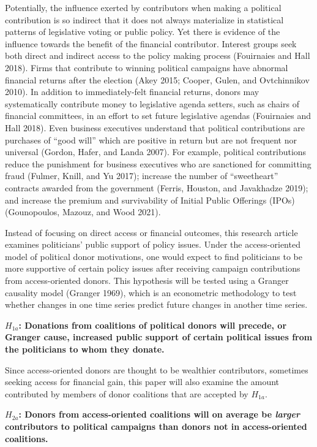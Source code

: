 \documentclass[12pt,]{article}
\begin{document}
Potentially, the influence exerted by contributors when making a
political contribution is so indirect that it does not always
materialize in statistical patterns of legislative voting or public
policy. Yet there is evidence of the influence towards the benefit of
the financial contributor. Interest groups seek both direct and indirect
access to the policy making process (Fouirnaies and Hall 2018). Firms
that contribute to winning political campaigns have abnormal financial
returns after the election (Akey 2015; Cooper, Gulen, and Ovtchinnikov
2010). In addition to immediately-felt financial returns, donors may
systematically contribute money to legislative agenda setters, such as
chairs of financial committees, in an effort to set future legislative
agendas (Fouirnaies and Hall 2018). Even business executives understand
that political contributions are purchases of ``good will'' which are
positive in return but are not frequent nor universal (Gordon, Hafer,
and Landa 2007). For example, political contributions reduce the
punishment for business executives who are sanctioned for committing
fraud (Fulmer, Knill, and Yu 2017); increase the number of
``sweetheart'' contracts awarded from the government (Ferris, Houston,
and Javakhadze 2019); and increase the premium and survivability of
Initial Public Offerings (IPOs) (Gounopoulos, Mazouz, and Wood 2021).

Instead of focusing on direct access or financial outcomes, this
research article examines politicians' public support of policy issues.
Under the access-oriented model of political donor motivations, one
would expect to find politicians to be more supportive of certain policy
issues after receiving campaign contributions from access-oriented
donors. This hypothesis will be tested using a Granger causality model
(Granger 1969), which is an econometric methodology to test whether
changes in one time series predict future changes in another time
series.

\textbf{\(H_{1a}\): Donations from coalitions of political donors will
precede, or Granger cause, increased public support of certain political
issues from the politicians to whom they donate.}

Since access-oriented donors are thought to be wealthier contributors,
sometimes seeking access for financial gain, this paper will also
examine the amount contributed by members of donor coalitions that are
accepted by \(H_{1a}\).

\textbf{\(H_{2a}\): Donors from access-oriented coalitions will on
average be \emph{larger} contributors to political campaigns than donors
not in access-oriented coalitions.}
\end{document}
